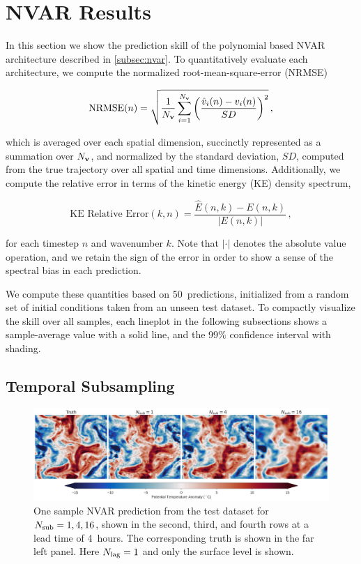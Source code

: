 \section{NVAR Results}
\label{sec:nvar-results}

In this section we show the prediction skill of the polynomial based NVAR architecture
described in \cref{subsec:nvar}.
To quantitatively evaluate each architecture, we compute
the normalized root-mean-square-error (NRMSE)
\begin{linenomath*}\begin{equation}
    \text{NRMSE}(n) = \sqrt{\dfrac{1}{N_{\mathbf{v}}}\sum_{i=1}^{N_{\mathbf{v}}}\left(
        \dfrac{\hat{v}_i(n) - v_i(n)}{SD}
        \right)^2 } \, ,
    \label{eq:nrmse}
\end{equation}\end{linenomath*}
which is averaged over each spatial dimension, succinctly represented as a
summation over $N_{\mathbf{v}}$, and normalized by the standard deviation, $SD$,
computed from the true trajectory over all spatial and time dimensions.
Additionally, we compute the relative error in terms of the kinetic energy
(KE) density spectrum,
\begin{linenomath*}\begin{equation}
    \text{KE Relative Error}(k, n) =
    \dfrac{\hat{E}(n, k) - E(n, k)}{|E(n,k)|} \, ,
    \label{eq:ke_relerr}
\end{equation}\end{linenomath*}
for each timestep $n$ and wavenumber $k$.
Note that $|\cdot|$ denotes the absolute value operation,
and we retain the sign of the error in order to show a sense of the
spectral bias in each prediction.

We compute these quantities based on 50~predictions, initialized from a random
set of initial conditions taken from an unseen test dataset.
To compactly visualize the skill over all samples, each lineplot in the
following subsections shows a sample-average value with a solid line, and the
99\% confidence interval with shading.

\subsection{Temporal Subsampling}
\label{subsec:nvar-subsampling}


\begin{figure}
    \centering
    \includegraphics[width=\textwidth]{../figures/nvar_4hr_snap.jpg}
    \caption{One sample NVAR prediction from the test dataset for $N_\text{sub} =
        1,4,16$, shown in the second, third, and fourth rows at a lead time of 4~hours.
        The corresponding truth is shown in the far left panel.
        Here $N_\text{lag}=1$ and only the surface level is shown.
    }
    \label{fig:nvar_qualitative}
\end{figure}


